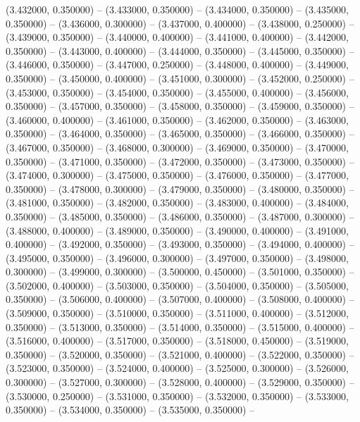 (3.432000, 0.350000) -- 
(3.433000, 0.350000) -- 
(3.434000, 0.350000) -- 
(3.435000, 0.350000) -- 
(3.436000, 0.300000) -- 
(3.437000, 0.400000) -- 
(3.438000, 0.250000) -- 
(3.439000, 0.350000) -- 
(3.440000, 0.400000) -- 
(3.441000, 0.400000) -- 
(3.442000, 0.350000) -- 
(3.443000, 0.400000) -- 
(3.444000, 0.350000) -- 
(3.445000, 0.350000) -- 
(3.446000, 0.350000) -- 
(3.447000, 0.250000) -- 
(3.448000, 0.400000) -- 
(3.449000, 0.350000) -- 
(3.450000, 0.400000) -- 
(3.451000, 0.300000) -- 
(3.452000, 0.250000) -- 
(3.453000, 0.350000) -- 
(3.454000, 0.350000) -- 
(3.455000, 0.400000) -- 
(3.456000, 0.350000) -- 
(3.457000, 0.350000) -- 
(3.458000, 0.350000) -- 
(3.459000, 0.350000) -- 
(3.460000, 0.400000) -- 
(3.461000, 0.350000) -- 
(3.462000, 0.350000) -- 
(3.463000, 0.350000) -- 
(3.464000, 0.350000) -- 
(3.465000, 0.350000) -- 
(3.466000, 0.350000) -- 
(3.467000, 0.350000) -- 
(3.468000, 0.300000) -- 
(3.469000, 0.350000) -- 
(3.470000, 0.350000) -- 
(3.471000, 0.350000) -- 
(3.472000, 0.350000) -- 
(3.473000, 0.350000) -- 
(3.474000, 0.300000) -- 
(3.475000, 0.350000) -- 
(3.476000, 0.350000) -- 
(3.477000, 0.350000) -- 
(3.478000, 0.300000) -- 
(3.479000, 0.350000) -- 
(3.480000, 0.350000) -- 
(3.481000, 0.350000) -- 
(3.482000, 0.350000) -- 
(3.483000, 0.400000) -- 
(3.484000, 0.350000) -- 
(3.485000, 0.350000) -- 
(3.486000, 0.350000) -- 
(3.487000, 0.300000) -- 
(3.488000, 0.400000) -- 
(3.489000, 0.350000) -- 
(3.490000, 0.400000) -- 
(3.491000, 0.400000) -- 
(3.492000, 0.350000) -- 
(3.493000, 0.350000) -- 
(3.494000, 0.400000) -- 
(3.495000, 0.350000) -- 
(3.496000, 0.300000) -- 
(3.497000, 0.350000) -- 
(3.498000, 0.300000) -- 
(3.499000, 0.300000) -- 
(3.500000, 0.450000) -- 
(3.501000, 0.350000) -- 
(3.502000, 0.400000) -- 
(3.503000, 0.350000) -- 
(3.504000, 0.350000) -- 
(3.505000, 0.350000) -- 
(3.506000, 0.400000) -- 
(3.507000, 0.400000) -- 
(3.508000, 0.400000) -- 
(3.509000, 0.350000) -- 
(3.510000, 0.350000) -- 
(3.511000, 0.400000) -- 
(3.512000, 0.350000) -- 
(3.513000, 0.350000) -- 
(3.514000, 0.350000) -- 
(3.515000, 0.400000) -- 
(3.516000, 0.400000) -- 
(3.517000, 0.350000) -- 
(3.518000, 0.450000) -- 
(3.519000, 0.350000) -- 
(3.520000, 0.350000) -- 
(3.521000, 0.400000) -- 
(3.522000, 0.350000) -- 
(3.523000, 0.350000) -- 
(3.524000, 0.400000) -- 
(3.525000, 0.300000) -- 
(3.526000, 0.300000) -- 
(3.527000, 0.300000) -- 
(3.528000, 0.400000) -- 
(3.529000, 0.350000) -- 
(3.530000, 0.250000) -- 
(3.531000, 0.350000) -- 
(3.532000, 0.350000) -- 
(3.533000, 0.350000) -- 
(3.534000, 0.350000) -- 
(3.535000, 0.350000) -- 
